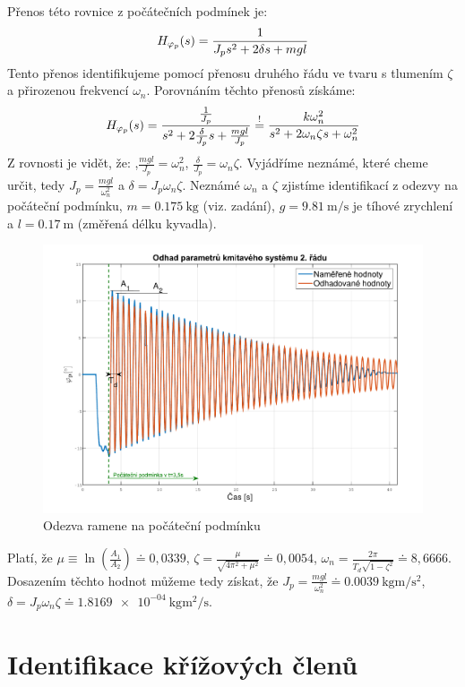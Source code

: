 \documentclass[11pt,a4paper]{article}
\begin{document}
Přenos této rovnice z počátečních podmínek je: 
$$
H_{\phin{p}}(s) = \frac{1}{J_p s^2 + 2 \delta s + m g l}
$$
\newcommand{\wn}{\omega_n}
\newcommand{\ut}{\zeta} %
Tento přenos identifikujeme pomocí přenosu druhého řádu ve tvaru s tlumením $\ut$ a přirozenou frekvencí $\wn$. Porovnáním těchto přenosů získáme:
$$
H_{\phin{p}}(s) = \frac{\frac{1}{J_p}}{s^2 + 2 \frac{\delta}{J_p} s + \frac{m g l}{J_p}}
\overset{!}{=} 
\frac{k \wn^2}{s^2 + 2 \wn \ut s + \wn^2}
$$
Z rovnosti je vidět, že: ,$\frac{m g l}{J_p} = \wn^2$, $\frac{\delta}{J_p} = \wn \ut$. %
Vyjádříme neznámé, které cheme určit, tedy $J_p = \frac{m g l}{\wn^2}$ a $\delta = J_p \wn \ut$. Neznámé $\wn$ a $\ut$ zjistíme identifikací z odezvy na počáteční podmínku, $m = \SI{0,175}{\kg}$ (viz. zadání), $g = \SI{9,81}{\meter \per \second}$ je tíhové zrychlení a $l = \SI{0,17}{\metre}$ (změřená délku kyvadla).

\begin{figure}[H]
	\centering
    \includegraphics[scale=.6]{Odhad_phip.pdf}
    \caption{Odezva ramene na počáteční podmínku}
\end{figure}


Platí, že $\mu \equiv \ln{(\frac{A_1}{A_2})} \doteq 0,0339$, $\ut = \frac{\mu}{\sqrt{4 \pi^2 + \mu^2}} \doteq 0,0054$, $\wn = \frac{2 \pi}{T_d \sqrt{1 - \ut^2}} \doteq 8,6666$. Dosazením těchto hodnot můžeme tedy získat, že $J_p = \frac{m g l}{\wn^2} \doteq \SI{0.0039}{\kilo \gram \metre \per \second \squared}$, $\delta = J_p \wn \ut \doteq \SI{1.8169e-04}{\kg \m \squared \per \second}$.


\section{Identifikace křížových členů}
\end{document}
